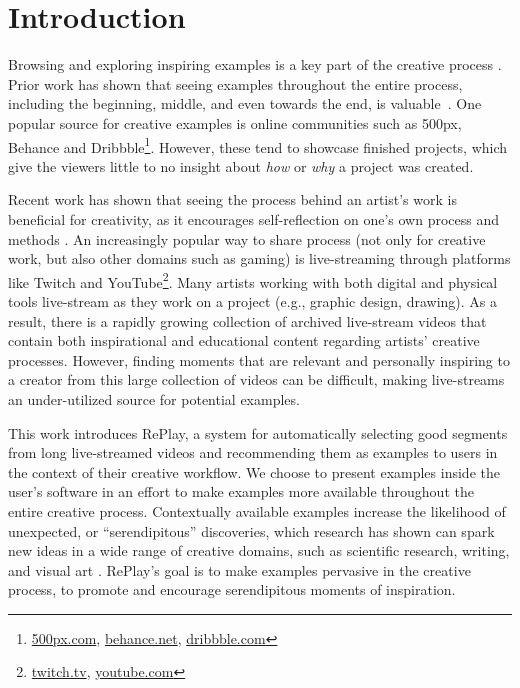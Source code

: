 \section{Introduction}
Browsing and exploring inspiring examples is a key part of the creative process \cite{Shneiderman2007, Shneiderman2002, Greene2002, Herring2009, Bawden1986}. Prior work has shown that seeing examples throughout the entire process, including the beginning, middle, and even towards the end, is valuable~\cite{Kulkarni2014, Siangliulue2015}. One popular source for creative examples is online communities such as 500px, Behance and Dribbble\footnote{\url{500px.com}, \url{behance.net}, \url{dribbble.com}}. However, these tend to showcase finished projects, which give the viewers little to no insight about \textit{how} or \textit{why} a project was created. 

Recent work has shown that seeing the process behind an artist's work is beneficial for creativity, as it encourages self-reflection on one's own process and methods \cite{Kim2017}. An increasingly popular way to share process (not only for creative work, but also other domains such as gaming) is live-streaming through platforms like Twitch and YouTube\footnote{\url{twitch.tv}, \url{youtube.com}}. Many artists working with both digital and physical tools live-stream as they work on a project (e.g., graphic design, drawing). As a result, there is a rapidly growing collection of archived live-stream videos that contain both inspirational and educational content regarding artists' creative processes. However, finding moments that are relevant and personally inspiring to a creator from this large collection of videos can be difficult, making live-streams an under-utilized source for potential examples.

This work introduces RePlay, a system for automatically selecting good segments from long live-streamed videos and recommending them as examples to users in the context of their creative workflow. We choose to present examples inside the user's software in an effort to make examples more available throughout the entire creative process.
Contextually available examples increase the likelihood of unexpected, or ``serendipitous'' discoveries, which research has shown can spark new ideas in a wide range of creative domains, such as scientific research, writing, and visual art \cite{Bawden1986, Benjamin2014, Foster2003, Erdelez1999}. RePlay's goal is to make examples pervasive in the creative process, to promote and encourage serendipitous moments of inspiration. 

